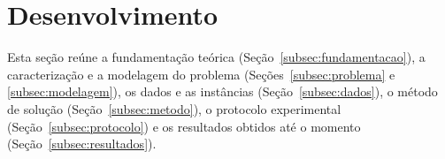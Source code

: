 \documentclass[12pt,a4paper]{article}
\begin{document}






\section{Desenvolvimento}
\label{sec:desenvolvimento}

Esta seção reúne a fundamentação teórica (Seção~\ref{subsec:fundamentacao}), a caracterização e a modelagem do problema (Seções~\ref{subsec:problema} e \ref{subsec:modelagem}), os dados e as instâncias (Seção~\ref{subsec:dados}), o método de solução (Seção~\ref{subsec:metodo}), o protocolo experimental (Seção~\ref{subsec:protocolo}) e os resultados obtidos até o momento (Seção~\ref{subsec:resultados}).









\begin{singlespace}

\end{singlespace}


\end{document}

